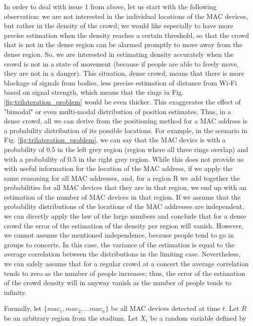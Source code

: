 \documentclass[10pt,a4paper]{article}
\begin{document}
In order to deal with issue 1 from above, let us start with the following observation: we are not interested in the individual locations of the MAC devices, but rather in the density of the crowd; we would like especially to have more precise estimation when the density reaches a certain threshold, so that the crowd that is not in the dense region can be alarmed promptly to move away from the dense region. So, we are interested in estimating density accurately when the crowd is not in a state of movement (because if people are able to freely move, they are not in a danger). 
This situation, dense crowd, means that there is more blockage of signals from bodies, less precise estimation of distance from Wi-Fi based on signal strength, which means that the rings in Fig.\ref{fig:trilateration_problem} would be even thicker. This exaggerates the effect of "bimodal" or even multi-modal distribution of position estimates. Thus, in a dense crowd, all we can derive from the positioning method for a MAC address is a probability distribution of its possible locations. For example, in the scenario in Fig. \ref{fig:trilateration_problem}, we can say that the MAC device is with a probability of 0.5 in the left grey region (region where all three rings overlap) and with a probability of 0.5 in the right grey region. While this does not provide us with useful information for the location of the MAC address, if we apply the same reasoning for all MAC addresses, and, for a region R we add together the probabilities for all MAC devices that they are in that region, we end up with an estimation of the number of MAC devices in that region. If we assume that the probability distributions of the locations of the MAC addresses are independent, we can directly apply the law of the large numbers and conclude that for a dense crowd the error of the estimation of the density per region will vanish. However, we cannot assume the mentioned independence, because people tend to go in groups to concerts. In this case, the variance of the estimation is equal to the average correlation between the distributions in the limiting case. Nevertheless, we can safely assume that for a regular crowd at a concert the average correlation tends to zero as the number of people increases; thus, the error of the estimation of the crowd density will in anyway vanish as the number of people tends to infinity. 

Formally, 
let $\{mac_1, mac_2,...mac_n\}$ be all MAC devices detected at time $t$. Let $R$ be an arbitrary region from the stadium.  Let $X_i$ be a random variable defined by
\end{document}
